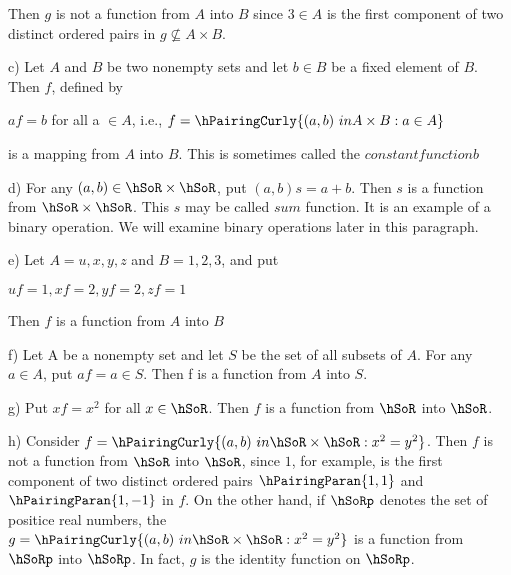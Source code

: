\documentclass[11pt]{amsbook}
\begin{document}

Then $g$ is not a function from $A$ into $B$ since $3 \in A$ is the first component of two distinct ordered pairs in $g \not\subseteq A \times B$.
\newline
\item c) Let $A$ and $B$ be two nonempty sets and let $ b \in B$ be a fixed element of $B$. Then $f$, defined by
\begin{center}
    $af = b$ for all a $\in A$, i.e., $f =\hPairingCurly{(a,b) \ in A \times B: a\in A}$\\
\end{center}

is a mapping from $A$ into $B$. This is sometimes called the $constant function b$\\
\newline
\item d) For any $(a,b) \in \hSoR \times \hSoR$, put $(a,b)s = a + b$. Then $s$ is a function from $\hSoR \times \hSoR$. This $s$ may be called $sum$ function. It is an example of a binary operation. We will examine binary operations later in this paragraph.\\
\newline
\item e) Let $A = {u,x,y,z}$ and $B = {1,2,3}$, and put
\begin{center}
$uf = 1, xf = 2, yf=2, zf=1$\\
\end{center}
Then $f$ is a function from $A$ into $B$\\
\newline
\item f) Let A be a nonempty set and let $S$ be the set of all subsets of $A$. For any $ a \in A $, put $af ={a} \in S$. Then f is a function from $A$ into $S$.\\
\newline
\item g) Put $xf = x^{2}$ for all $x \in  \hSoR$. Then $f$ is a function from $\hSoR$ into $\hSoR$.\\
\newline
\item
h) Consider $f =\hPairingCurly{(a,b) \ in \hSoR \times \hSoR: x^{2} = y^{2}}$. Then $f$ is not a function from $\hSoR$ into $\hSoR$, since $1$, for example, is the first component of two distinct ordered pairs $\hPairingParan{1,1}$ and $\hPairingParan{1,-1}$ in $f$. On the other hand, if $\hSoRp$ denotes the set of positice real numbers, the $g =\hPairingCurly{(a,b) \ in \hSoR \times \hSoR: x^{2} = y^{2}}$ is a function from $\hSoRp$ into $\hSoRp$. In fact, $g$ is the identity function on $\hSoRp$.\\
\end{document}
